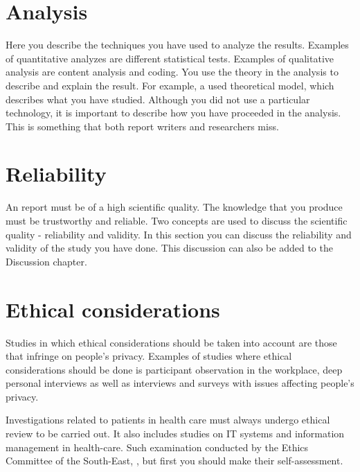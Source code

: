 \section{Analysis}
Here you describe the techniques you have used to analyze the results. Examples of quantitative analyzes are different statistical tests. Examples of qualitative analysis are content analysis and coding. You use the theory in the analysis to describe and explain the result. For example, a used theoretical model, which describes what you have studied. Although you did not use a particular technology, it is important to describe how you have proceeded in the analysis. This is something that both report writers and researchers miss.

\section{Reliability}
An report must be of a high scientific quality. The knowledge that you produce must be trustworthy and reliable. Two concepts are used to discuss the scientific quality - reliability and validity. In this section you can discuss the reliability and validity of the study you have done. This discussion can also be added to the Discussion chapter.

\section{Ethical considerations}
Studies in which ethical considerations should be taken into account are those that infringe on people's privacy. Examples of studies where ethical considerations should be done is participant observation in the workplace, deep personal interviews as well as interviews and surveys with issues affecting people's privacy.

Investigations related to patients in health care must always undergo ethical review to be carried out. It also includes studies on IT systems and information management in health-care. Such examination conducted by the Ethics Committee of the South-East, \cite{etik}, but first you should make their self-assessment.
